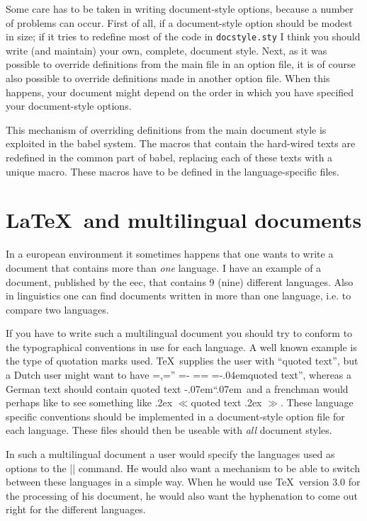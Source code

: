 \documentclass{ltugboat}
\makeatletter
\newcommand{\file}[1]{\texttt{#1}}
\newcommand{\babel}{\textsf{babel}}
\gdef\dlqq{{\setbox\tw@=\hbox{,}\setbox\z@=\hbox{''}%
  \dimen\z@=\ht\z@ \advance\dimen\z@-\ht\tw@
  \setbox\z@=\hbox{\lower\dimen\z@\box\z@}\ht\z@=\ht\tw@
  \dp\z@=\dp\tw@ \box\z@\kern-.04em}}
\def\allowhyphens{\penalty\@M \hskip\z@skip}
\def\set@low@box#1{\setbox\tw@\hbox{,}\setbox\z@\hbox{#1}\dimen\z@\ht\z@
     \advance\dimen\z@ -\ht\tw@
     \setbox\z@\hbox{\lower\dimen\z@ \box\z@}\ht\z@\ht\tw@ \dp\z@\dp\tw@ }
\def\@glqq{{\ifhmode \edef\@SF{\spacefactor\the\spacefactor}\else
     \let\@SF\empty \fi \leavevmode
     \set@low@box{''}\box\z@\kern-.04em\allowhyphens\@SF\relax}}
\def\glqq{\protect\@glqq}
\def\@grqq{\ifhmode \edef\@SF{\spacefactor\the\spacefactor}\else
     \let\@SF\empty \fi \kern-.07em``\kern.07em\@SF\relax}%
\def\grqq{\protect\@grqq}
\def\@flqq{\ifhmode \edef\@SF{\spacefactor\the\spacefactor}\else
     \let\@SF\empty \fi
     \ifmmode \ll \else \leavevmode
     \raise .2ex \hbox{$\scriptscriptstyle \ll $}\fi \@SF\relax}
\def\flqq{\protect\@flqq}
\def\@frqq{\ifhmode \edef\@SF{\spacefactor\the\spacefactor}\else
     \let\@SF\empty \fi
     \ifmmode \gg \else \leavevmode
     \raise .2ex \hbox{$\scriptscriptstyle \gg $}\fi \@SF\relax}
\def\frqq{\protect\@frqq}
\makeatother
\begin{document}
Some care has to be taken in writing document-style options, because a
number of problems can occur. First of all, if a document-style option
should be modest in size; if it tries to redefine most of the code in
\file{docstyle.sty} I think you should write (and maintain) your own,
complete, document style.  Next, as it was possible to override
definitions from the main file in an option file, it is of course also
possible to override definitions made in another option file. When
this happens, your document might depend on the order in which you
have specified your document-style options.

This mechanism of overriding definitions from the main document style
is exploited in the \babel{} system. The macros that contain the
hard-wired texts are redefined in the common part of \babel{},
replacing each of these texts with a unique macro. These macros have
to be defined in the language-specific files.

\section{\LaTeX\ and multilingual documents}\label{lat-lingual}

In a european environment it sometimes happens that one wants to write
a document that contains more than \emph{one} language. I have an
example of a document, published by the {\sc eec}, that contains 9
(nine) different languages. Also in linguistics one can find documents
written in more than one language, i.e. to compare two languages.

If you have to write such a multilingual document you should try to
conform to the typographical conventions in use for each language. A
well known example is the type of quotation marks used. \TeX\ supplies
the user with ``quoted text'', but a Dutch user might want to have
\dlqq quoted text'', whereas a German text should contain \glqq quoted
text\grqq\ and a frenchman would perhaps like to see something like
\flqq quoted text\frqq. These language specific conventions should be
implemented in a document-style option file for each language. These
files should then be useable with \emph{all} document styles.

In such a multilingual document a user would specify the languages
used as options to the |\documentstyle| command. He would also want a
mechanism to be able to switch between these languages in a simple
way. When he would use \TeX\ version 3.0 for the processing of his
document, he would also want the hyphenation to come out right for the
different languages.
\end{document}
